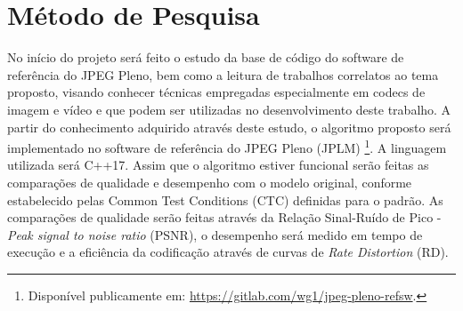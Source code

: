 \section{Método de Pesquisa}
    No início do projeto será feito o estudo da base de código do software de referência do JPEG Pleno, bem como a leitura de trabalhos correlatos ao
    tema proposto, visando conhecer técnicas empregadas especialmente em codecs de imagem e vídeo e que podem ser utilizadas no desenvolvimento deste 
    trabalho. A partir do conhecimento adquirido através deste estudo, o algoritmo proposto será implementado no software de referência do JPEG Pleno
    (JPLM) \footnote{Disponível publicamente em: \url{https://gitlab.com/wg1/jpeg-pleno-refsw}.}. A linguagem utilizada será C++17. Assim que o algoritmo 
    estiver funcional serão feitas as comparações de qualidade e desempenho com o modelo original, conforme estabelecido pelas Common Test Conditions (CTC)
    definidas para o padrão. As comparações de qualidade serão feitas através da Relação Sinal-Ruído de Pico - \textit{Peak signal to noise ratio} (PSNR),
    o desempenho será medido em tempo de execução e a eficiência da codificação através de curvas de \textit{Rate Distortion} (RD).
